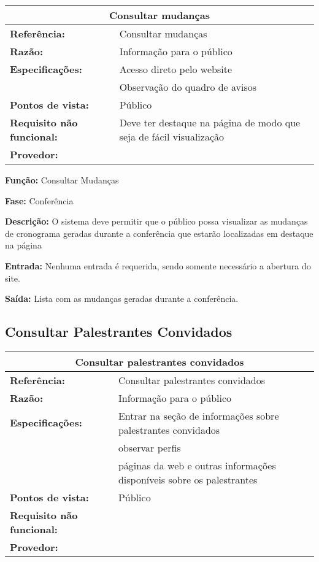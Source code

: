 \documentclass[letter]{article}
\begin{document}
%
\begin{table}[h!]\begin{center}
\begin{tabular}{|ll|}
\hline 
\multicolumn{2}{|c|}{\textbf{Consultar mudanças}}\tabularnewline
\hline
\textbf{Referência:} & Consultar mudanças\tabularnewline
\textbf{Razão:} & Informação para o público\tabularnewline
\textbf{Especificações:} & Acesso direto pelo website\tabularnewline
 & Observação do quadro de avisos\tabularnewline
\textbf{Pontos de vista:} & Público\tabularnewline
\textbf{Requisito não funcional:} & Deve ter destaque na página de modo que seja de fácil visualização\tabularnewline
\textbf{Provedor:} & \tabularnewline
\hline\end{tabular}\end{center}
\end{table}


\textbf{Função:}  Consultar Mudanças

\textbf{Fase:}  Conferência

\textbf{Descrição:}  O sistema deve permitir que o público possa visualizar as mudanças de cronograma geradas durante a conferência que estarão localizadas em destaque na página

\textbf{Entrada:}  Nenhuma entrada é requerida, sendo somente necessário a abertura do site.

\textbf{Saída:}  Lista com as mudanças geradas durante a conferência.

\subsection{Consultar Palestrantes Convidados}

%
\begin{table}[h!]\begin{center}
\begin{tabular}{|ll|}
\hline 
\multicolumn{2}{|c|}{\textbf{Consultar palestrantes convidados}}\tabularnewline
\hline
\textbf{Referência:} & Consultar palestrantes convidados\tabularnewline
\textbf{Razão:} & Informação para o público\tabularnewline
\textbf{Especificações:} & Entrar na seção de informações sobre palestrantes convidados\tabularnewline
 & observar perfis\tabularnewline
 & páginas da web e outras informações disponíveis sobre os palestrantes\tabularnewline
\textbf{Pontos de vista:} & Público\tabularnewline
\textbf{Requisito não funcional:} & \tabularnewline
\textbf{Provedor:} & \tabularnewline
\hline\end{tabular}\end{center}
\end{table}
\end{document}
